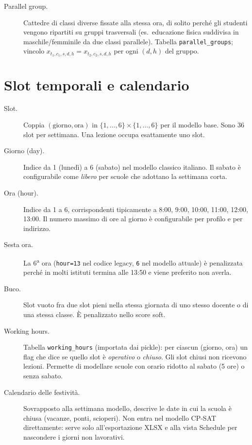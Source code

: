 \begin{description}
\item[Parallel group.]
  Cattedre di classi diverse fissate alla stessa ora, di
  solito perch\'e gli studenti vengono ripartiti su gruppi
  trasversali (es.\ educazione fisica suddivisa in
  maschile/femminile da due classi parallele). Tabella
  \texttt{parallel\_groups}; vincolo
  $x_{t_1, c_1, s, d, h} = x_{t_2, c_2, s, d, h}$ per ogni
  $(d, h)$ del gruppo.
\end{description}

\section{Slot temporali e calendario}

\begin{description}
\item[Slot.]
  Coppia $(\text{giorno}, \text{ora})$ in
  $\{1,\ldots,6\} \times \{1,\ldots,6\}$ per il modello base.
  Sono 36 slot per settimana. Una lezione occupa esattamente
  uno slot.

\item[Giorno (day).]
  Indice da 1 (luned\`i) a 6 (sabato) nel modello classico
  italiano. Il sabato \`e configurabile come \emph{libero}
  per scuole che adottano la settimana corta.

\item[Ora (hour).]
  Indice da 1 a 6, corrispondenti tipicamente a 8:00, 9:00,
  10:00, 11:00, 12:00, 13:00. Il numero massimo di ore al
  giorno \`e configurabile per profilo e per indirizzo.

\item[Sesta ora.]
  La 6\textsuperscript{a} ora (\texttt{hour=13} nel codice
  legacy, \texttt{6} nel modello attuale) \`e penalizzata
  perch\'e in molti istituti termina alle 13:50 e viene
  preferito non averla.

\item[Buco.]
  Slot vuoto fra due slot pieni nella stessa giornata di
  uno stesso docente o di una stessa classe. \`E penalizzato
  nello score soft.

\item[Working hours.]
  Tabella \texttt{working\_hours} (importata dai pickle):
  per ciascun (giorno, ora) un flag che dice se quello slot
  \`e \emph{operativo} o \emph{chiuso}. Gli slot chiusi non
  ricevono lezioni. Permette di modellare scuole con
  orario ridotto al sabato (5 ore) o senza sabato.

\item[Calendario delle festivit\`a.]
  Sovrapposto alla settimana modello, descrive le date in
  cui la scuola \`e chiusa (vacanze, ponti, scioperi). Non
  entra nel modello CP-SAT direttamente: serve solo
  all'esportazione XLSX e alla vista Schedule per nascondere
  i giorni non lavorativi.
\end{description}

